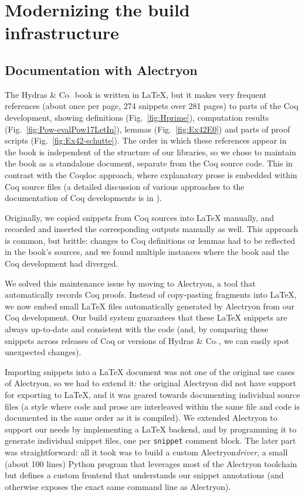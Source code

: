 \documentclass{easychair}
\newcommand{\coq}{Coq\xspace}
\newcommand{\alectr}{Alectryon\xspace}
\newcommand{\Hydras}{Hydras \& Co$\text.$\xspace}
\begin{document}

\section{Modernizing the build infrastructure}

\subsection{Documentation with \alectr}

The \Hydras book is written in LaTeX, but it makes very frequent references (about once per page, 274 snippets over 281 pages) to parts of the \coq development, showing definitions (Fig.~\ref{fig:Hprime}), computation results (Fig.~\ref{fig:Pow-evalPow17LetIn}), lemmas (Fig.~\ref{fig:Ex42E0}) and parts of  proof scripts (Fig.~\ref{fig:Ex42-schutte}). The order in which these references appear in the book is independent of the structure of our libraries, so we chose to maintain the book as a standalone document, separate from the \coq source code.  This in contrast with the Coqdoc approach, where explanatory prose is embedded within \coq source files (a detailed discussion of various approaches to the documentation of \coq developments is in \cite{alectryonpaper}).

Originally, we copied snippets from \coq sources into LaTeX manually, and recorded and inserted the corresponding outputs manually as well.  This approach is common, but brittle: changes to \coq definitions or lemmas had to be reflected in the book's sources, and we found multiple instances where the book and the \coq development had diverged.
 
We solved this maintenance issue by moving to \alectr, a tool that automatically records \coq proofs.  Instead of copy-pasting fragments into LaTeX, we now embed small LaTeX files automatically generated by \alectr from our \coq development.  Our build system guarantees that these LaTeX snippets are always up-to-date and consistent with the code (and, by comparing these snippets across releases of \coq or versions of \Hydras, we can easily spot unexpected changes).

Importing snippets into a LaTeX document was not one of the original use cases of \alectr, so we had to extend it: the original \alectr did not have support for exporting to LaTeX, and it was geared towards documenting individual source files (a style where code and prose are interleaved within the same file and code is documented in the same order as it is compiled).  We extended \alectr to support our needs by implementing a LaTeX backend, and by programming it to generate individual snippet files, one per \texttt{snippet} comment block.  The later part was straightforward: all it took was to build a custom \alectr \textit{driver}, a small (about 100 lines) Python program that leverages most of the \alectr toolchain but defines a custom frontend that understands our snippet annotations (and otherwise exposes the exact same command line as \alectr).
\end{document}

